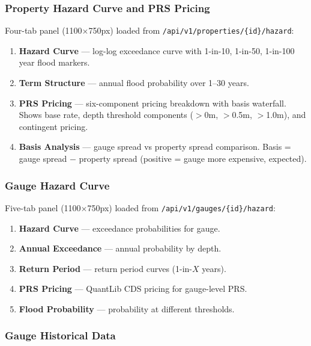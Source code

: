 \documentclass[11pt,a4paper]{article}
\begin{document}
\subsubsection{Property Hazard Curve and PRS Pricing}

Four-tab panel (1100$\times$750px) loaded from
\texttt{/api/v1/properties/\{id\}/hazard}:

\begin{enumerate}[nosep]
    \item \textbf{Hazard Curve} --- log-log exceedance curve with 1-in-10,
          1-in-50, 1-in-100 year flood markers.
    \item \textbf{Term Structure} --- annual flood probability over 1--30 years.
    \item \textbf{PRS Pricing} --- six-component pricing breakdown with basis
          waterfall. Shows base rate, depth threshold components ($>$0m,
          $>$0.5m, $>$1.0m), and contingent pricing.
    \item \textbf{Basis Analysis} --- gauge spread vs property spread
          comparison. Basis = gauge spread $-$ property spread (positive =
          gauge more expensive, expected).
\end{enumerate}

\subsubsection{Gauge Hazard Curve}

Five-tab panel (1100$\times$750px) loaded from
\texttt{/api/v1/gauges/\{id\}/hazard}:

\begin{enumerate}[nosep]
    \item \textbf{Hazard Curve} --- exceedance probabilities for gauge.
    \item \textbf{Annual Exceedance} --- annual probability by depth.
    \item \textbf{Return Period} --- return period curves (1-in-$X$ years).
    \item \textbf{PRS Pricing} --- QuantLib CDS pricing for gauge-level PRS.
    \item \textbf{Flood Probability} --- probability at different thresholds.
\end{enumerate}

\subsubsection{Gauge Historical Data}
\end{document}
